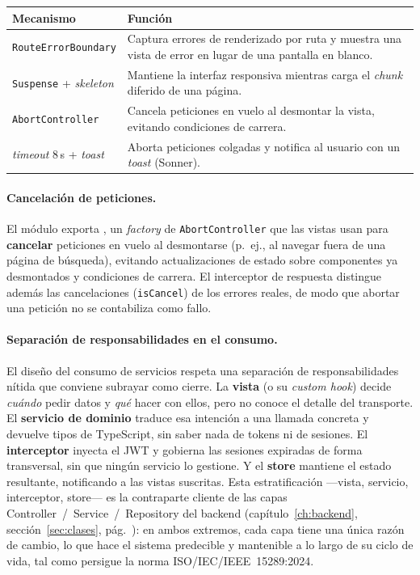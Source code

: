 \vspace{0.2cm}
\noindent
\renewcommand{\arraystretch}{1.3}
\fontsize{8.5}{10.2}\selectfont\sffamily
\begin{tabularx}{\textwidth}{|L{3.6cm}|Y|}
\hline
{}
\sffamily\textbf{Mecanismo} & \sffamily\textbf{Función} \\
\hline
\texttt{RouteErrorBoundary} & Captura errores de renderizado por ruta y muestra una vista de error en lugar de una pantalla en blanco. \\ \hline
{}
\texttt{Suspense} + \textit{skeleton} & Mantiene la interfaz responsiva mientras carga el \textit{chunk} diferido de una página. \\ \hline
\texttt{AbortController} & Cancela peticiones en vuelo al desmontar la vista, evitando condiciones de carrera. \\ \hline
{}
\textit{timeout} 8\,s + \textit{toast} & Aborta peticiones colgadas y notifica al usuario con un \textit{toast} (Sonner). \\ \hline
\end{tabularx}
\label{tab:resiliencia}

\paragraph{Cancelación de peticiones.} El módulo exporta ,
un \textit{factory} de \texttt{AbortController} que las vistas usan para \textbf{cancelar}
peticiones en vuelo al desmontarse (p.~ej., al navegar fuera de una página de búsqueda),
evitando actualizaciones de estado sobre componentes ya desmontados y condiciones de
carrera. El interceptor de respuesta distingue además las cancelaciones
(\texttt{isCancel}) de los errores reales, de modo que abortar una petición no se
contabiliza como fallo.

\paragraph{Separación de responsabilidades en el consumo.} El diseño del consumo de
servicios respeta una separación de responsabilidades nítida que conviene subrayar como
cierre. La \textbf{vista} (o su \textit{custom hook}) decide \textit{cuándo} pedir datos y
\textit{qué} hacer con ellos, pero no conoce el detalle del transporte. El \textbf{servicio
de dominio} traduce esa intención a una llamada concreta y devuelve tipos de TypeScript, sin
saber nada de tokens ni de sesiones. El \textbf{interceptor} inyecta el JWT y gobierna las
sesiones expiradas de forma transversal, sin que ningún servicio lo gestione. Y el
\textbf{store} mantiene el estado resultante, notificando a las vistas suscritas. Esta
estratificación —vista, servicio, interceptor, store— es la contraparte cliente de las
capas Controller~/~Service~/~Repository del backend (capítulo~\ref{ch:backend},
sección~\ref{sec:clases}, pág.~\pageref{sec:clases}): en ambos extremos, cada capa tiene una
única razón de cambio, lo que hace el sistema predecible y mantenible a lo largo de su
ciclo de vida, tal como persigue la norma ISO/IEC/IEEE~15289:2024.
